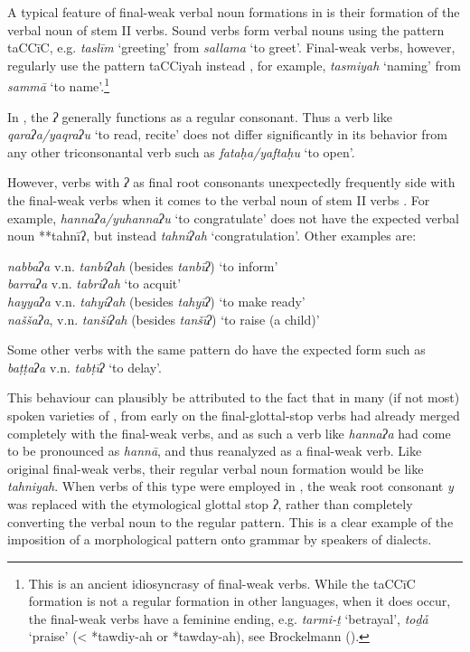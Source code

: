 \documentclass[output=paper]{langsci/langscibook}
\begin{document}
A typical feature of final-weak verbal noun formations in  is their {formation} of the verbal noun of {stem} II verbs. Sound verbs form verbal nouns using the pattern taCCīC, e.g. \textit{taslīm} ‘greeting’ from \textit{sallama} ‘to greet’. Final-weak verbs, however, regularly use the pattern taCCiyah instead \citep[44]{Fischer2002}, for example, \textit{tasmiyah} ‘naming’ from \textit{sammā} ‘to name’.\footnote{This is an ancient idiosyncrasy of final-weak verbs. While the taCCīC {formation} is not a regular {formation} in other  languages, when it does occur, the final-weak verbs have a feminine ending, e.g.  \textit{tarmi-ṯ} ‘betrayal’, \textit{toḏå} ‘praise’ (< *tawdiy-ah or *tawday-ah), see Brockelmann (\citeyear[385--387]{Brockelmann1908}).} 

In , the \textit{ʔ} generally functions as a regular consonant. Thus a verb like \textit{qaraʔa/yaqraʔu} ‘to read, recite’ does not differ significantly in its behavior from any other {triconsonantal} verb such as \textit{fataḥa/yaftaḥu} ‘to open’. 

However, verbs with \textit{ʔ} as final {root} consonants unexpectedly frequently side with the final-weak verbs when it comes to the verbal noun of {stem} II verbs \citep[128]{Fischer2002}. For example, \textit{hannaʔa/yuhannaʔu} ‘to congratulate’ does not have the expected verbal noun **tahnīʔ, but instead \textit{tahniʔah} ‘congratulation’. Other examples are:

\ea
\ea\textit{nabbaʔa} v.n. \textit{tanbiʔah} (besides \textit{tanbīʔ}) ‘to inform’\\
\ex\textit{barraʔa} v.n. \textit{tabriʔah} ‘to acquit’\\
\ex\textit{hayyaʔa} v.n. \textit{tahyiʔah} (besides \textit{tahyīʔ}) ‘to make ready’\\
\ex\textit{naššaʔa}, v.n. \textit{tanšiʔah} (besides \textit{tanšīʔ}) ‘to raise (a child)’
\z
\z

Some other verbs with the same pattern do have the expected  form such as \textit{baṭṭaʔa} v.n. \textit{tabṭīʔ} ‘to delay’.

This behaviour can plausibly be attributed to the fact that in many (if not most) spoken varieties of , from early on the final-glottal-stop verbs had already {merged} completely with the final-weak verbs, and as such a verb like \textit{hannaʔa} had come to be pronounced as \textit{hannā}, and thus reanalyzed as a final-weak verb. Like original final-weak verbs, their regular verbal noun {formation} would be like \textit{tahniyah}. When verbs of this type were employed in , the weak {root} consonant \textit{y} was replaced with the etymological glottal stop \textit{ʔ}, rather than completely converting the verbal noun to the regular pattern. This is a clear example of the {imposition} of a morphological pattern onto  grammar by speakers of  dialects.
\end{document}
